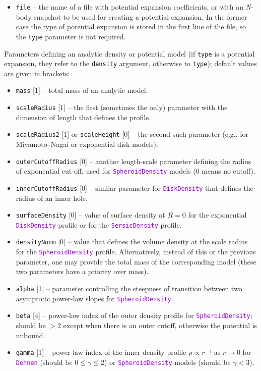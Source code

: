 \documentclass[12pt]{article}
\newcommand{\Nbody}{\textsl{N}-body\xspace}
\newcommand{\ttt}[1]{\textcolor{darkviolet}{\texttt{#1}}}
\newcommand{\ppp}[1]{\textcolor{darkolive} {\texttt{#1}}}
\begin{document}
\begin{itemize}
\item \ppp{file} -- the name of a file with potential expansion coefficients, or with an \Nbody snapshot to be used for creating a potential expansion. In the former case the type of potential expansion is stored in the first line of the file, so the \ppp{type} parameter is not required.
\end{itemize}
Parameters defining an analytic density or potential model (if \ppp{type} is a potential expansion, they refer to the \ppp{density} argument, otherwise to \ppp{type}); default values are given in brackets:
\begin{itemize}
\item \ppp{mass} [1] -- total mass of an analytic model.
\item \ppp{scaleRadius} [1] -- the first (sometimes the only) parameter with the dimension of length that defines the profile.
\item \ppp{scaleRadius2} [1] or \ppp{scaleHeight} [0] -- the second such parameter (e.g., for Miyamoto--Nagai or exponential disk models).
\item \ppp{outerCutoffRadius} [0] -- another length-scale parameter defining the radius of exponential cut-off, used for \ttt{SpheroidDensity} models (0 means no cutoff).
\item \ppp{innerCutoffRadius} [0] -- similar parameter for \ttt{DiskDensity} that defines the radius of an inner hole.
\item \ppp{surfaceDensity} [0] -- value of surface density at $R=0$ for the exponential \ttt{DiskDensity} profile or for the \ttt{SersicDensity} profile.
\item \ppp{densityNorm} [0] -- value that defines the volume density at the scale radius for the \ttt{SpheroidDensity} profile. Alternatively, instead of this or the previous parameter, one may provide the total mass of the corresponding model (these two parameters have a priority over mass).
\item \ppp{alpha} [1] -- parameter controlling the steepness of transition between two asymptotic power-law slopes for \ttt{SpheroidDensity}.
\item \ppp{beta} [4] -- power-law index of the outer density profile for \ttt{SpheroidDensity}; should be $>2$ except when there is an outer cutoff, otherwise the potential is unbound.
\item \ppp{gamma} [1] -- power-law index of the inner density profile $\rho \propto r^{-\gamma}$ as $r\to 0$ for \ttt{Dehnen} (should be $0\le\gamma\le 2$) or \ttt{SpheroidDensity} models (should be $\gamma<3$).

\end{itemize}
\end{document}
